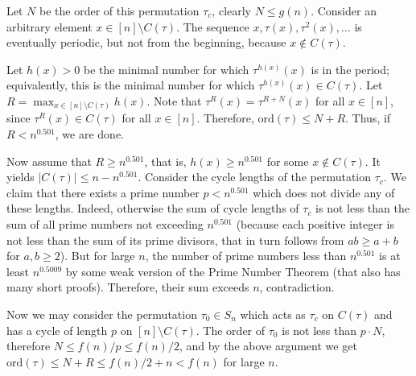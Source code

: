 \documentclass{article}
\begin{document}
Let $N$ be the order of this permutation $\tau_c$, clearly $N \leq g(n)$. Consider an arbitrary element $x \in [n] \setminus C(\tau)$. The sequence $x, \tau(x), \tau^2(x), \ldots$ is eventually periodic, but not from the beginning, because $x \notin C(\tau)$.

Let $h(x) > 0$ be the minimal number for which $\tau^{h(x)}(x)$ is in the period; equivalently, this is the minimal number for which $\tau^{h(x)}(x) \in C(\tau)$. Let $R = \max_{x \in [n] \setminus C(\tau)} h(x)$. Note that $\tau^R(x) = \tau^{R+N}(x)$ for all $x \in [n]$, since $\tau^R(x) \in C(\tau)$ for all $x \in [n]$. Therefore, $\mathrm{ord}(\tau) \leq N + R$. Thus, if $R < n^{0.501}$, we are done.

Now assume that $R \geq n^{0.501}$, that is, $h(x) \geq n^{0.501}$ for some $x \notin C(\tau)$. It yields $|C(\tau)| \leq n - n^{0.501}$. Consider the cycle lengths of the permutation $\tau_c$. We claim that there exists a prime number $p < n^{0.501}$ which does not divide any of these lengths. Indeed, otherwise the sum of cycle lengths of $\tau_c$ is not less than the sum of all prime numbers not exceeding $n^{0.501}$ (because each positive integer is not less than the sum of its prime divisors, that in turn follows from $ab \geq a + b$ for $a, b \geq 2$). But for large $n$, the number of prime numbers less than $n^{0.501}$ is at least $n^{0.5009}$ by some weak version of the Prime Number Theorem (that also has many short proofs). Therefore, their sum exceeds $n$, contradiction.

Now we may consider the permutation $\tau_0 \in S_n$ which acts as $\tau_c$ on $C(\tau)$ and has a cycle of length $p$ on $[n] \setminus C(\tau)$. The order of $\tau_0$ is not less than $p \cdot N$, therefore $N \leq f(n)/p \leq f(n)/2$, and by the above argument we get $\mathrm{ord}(\tau) \leq N + R \leq f(n)/2 + n < f(n)$ for large $n$.
\end{document}
